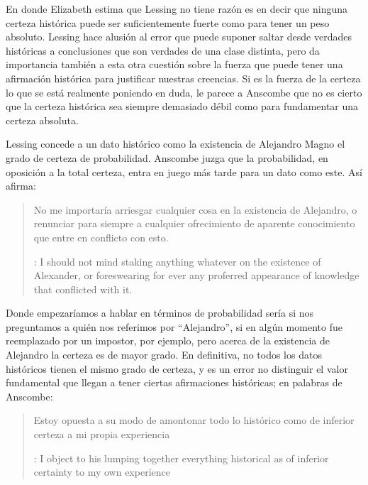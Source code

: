 En donde Elizabeth estima que Lessing no tiene razón es en decir que ninguna
certeza histórica puede ser suficientemente fuerte como para tener un peso
absoluto. Lessing hace alusión al error que puede suponer saltar desde verdades
históricas a conclusiones que son verdades de una clase distinta, pero da
importancia también a esta otra cuestión sobre la fuerza que puede tener una
afirmación histórica para justificar nuestras creencias. Si es la fuerza de la
certeza lo que se está realmente poniendo en duda, le parece a Anscombe que no
es cierto que la certeza histórica sea siempre demasiado débil como para
fundamentar una certeza absoluta.

Lessing concede a un dato histórico como la existencia de Alejandro Magno el
grado de certeza de probabilidad. Anscombe juzga que la probabilidad, en
oposición a la total certeza, entra en juego más tarde para un dato como este.
Así afirma: \blockquote[{\cite[26]{anscombe2008faith:prophandmi}}: I should not
mind staking anything whatever on the existence of Alexander, or foreswearing
for ever any proferred appearance of knowledge that conflicted with it.]{No me
  importaría arriesgar cualquier cosa en la existencia de Alejandro, o renunciar
  para siempre a cualquier ofrecimiento de aparente conocimiento que entre en
  conflicto con esto.} Donde empezaríamos a hablar en términos de probabilidad
sería si nos preguntamos a quién nos referimos por \enquote{Alejandro}, si en
algún momento fue reemplazado por un impostor, por ejemplo, pero acerca de la
existencia de Alejandro la certeza es de mayor grado. En definitiva, no todos
los datos históricos tienen el mismo grado de certeza, y es un error no
distinguir el valor fundamental que llegan a tener ciertas afirmaciones
históricas; en palabras de Anscombe:
\blockquote[{\cite[27]{anscombe2008faith:prophandmi}}: I object to his lumping
together everything historical as of inferior certainty to my own
experience]{Estoy opuesta a su modo de amontonar todo lo histórico como de
  inferior certeza a mi propia experiencia}.

